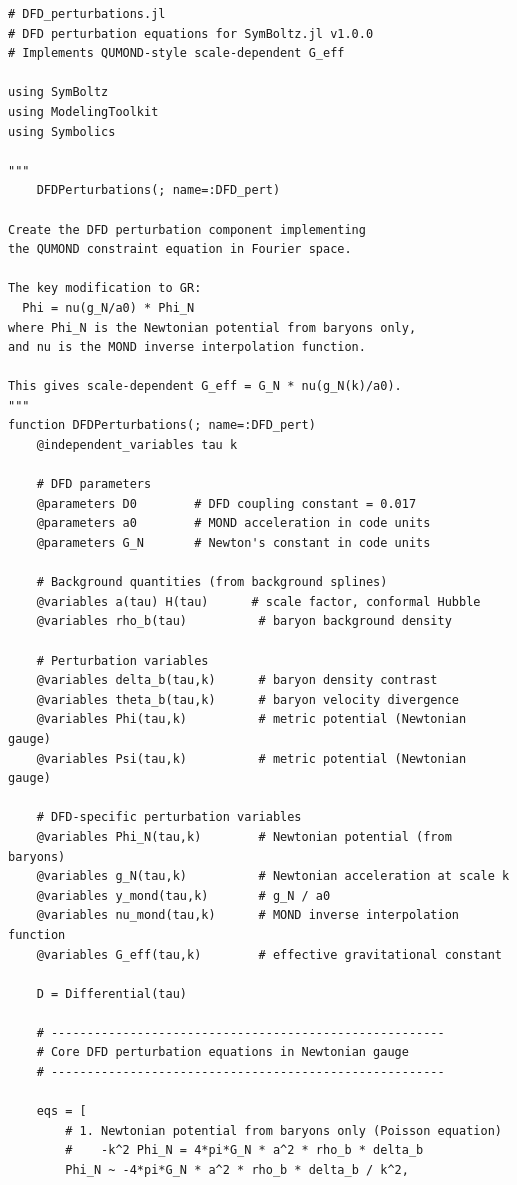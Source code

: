 \documentclass[11pt,a4paper]{article}
\begin{document}
\begin{lstlisting}[caption={DFD perturbation component for SymBoltz.jl},label={lst:pert}]
# DFD_perturbations.jl
# DFD perturbation equations for SymBoltz.jl v1.0.0
# Implements QUMOND-style scale-dependent G_eff

using SymBoltz
using ModelingToolkit
using Symbolics

"""
    DFDPerturbations(; name=:DFD_pert)

Create the DFD perturbation component implementing
the QUMOND constraint equation in Fourier space.

The key modification to GR:
  Phi = nu(g_N/a0) * Phi_N
where Phi_N is the Newtonian potential from baryons only,
and nu is the MOND inverse interpolation function.

This gives scale-dependent G_eff = G_N * nu(g_N(k)/a0).
"""
function DFDPerturbations(; name=:DFD_pert)
    @independent_variables tau k

    # DFD parameters
    @parameters D0        # DFD coupling constant = 0.017
    @parameters a0        # MOND acceleration in code units
    @parameters G_N       # Newton's constant in code units

    # Background quantities (from background splines)
    @variables a(tau) H(tau)      # scale factor, conformal Hubble
    @variables rho_b(tau)          # baryon background density

    # Perturbation variables
    @variables delta_b(tau,k)      # baryon density contrast
    @variables theta_b(tau,k)      # baryon velocity divergence
    @variables Phi(tau,k)          # metric potential (Newtonian gauge)
    @variables Psi(tau,k)          # metric potential (Newtonian gauge)

    # DFD-specific perturbation variables
    @variables Phi_N(tau,k)        # Newtonian potential (from baryons)
    @variables g_N(tau,k)          # Newtonian acceleration at scale k
    @variables y_mond(tau,k)       # g_N / a0
    @variables nu_mond(tau,k)      # MOND inverse interpolation function
    @variables G_eff(tau,k)        # effective gravitational constant

    D = Differential(tau)

    # -------------------------------------------------------
    # Core DFD perturbation equations in Newtonian gauge
    # -------------------------------------------------------

    eqs = [
        # 1. Newtonian potential from baryons only (Poisson equation)
        #    -k^2 Phi_N = 4*pi*G_N * a^2 * rho_b * delta_b
        Phi_N ~ -4*pi*G_N * a^2 * rho_b * delta_b / k^2,


\end{lstlisting}
\end{document}
